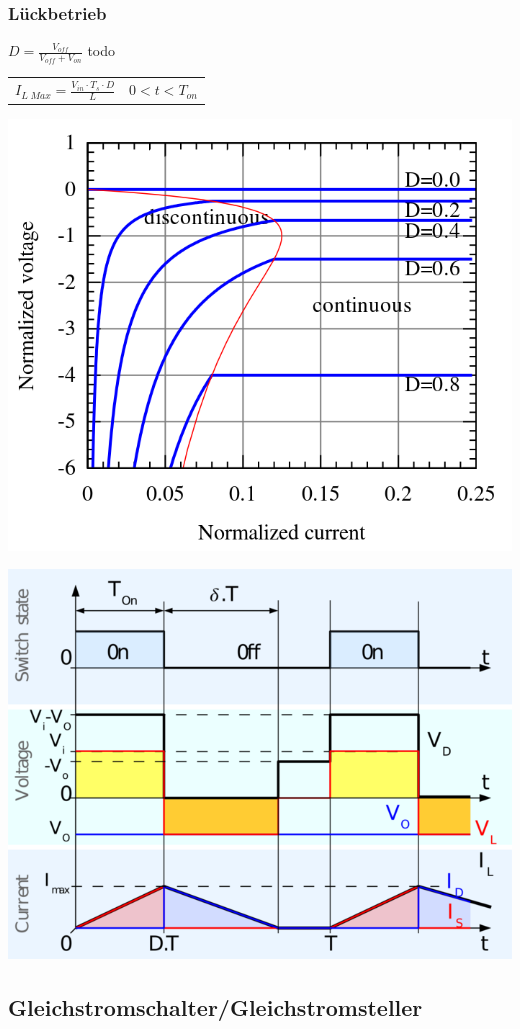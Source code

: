 \subsubsection{Lückbetrieb}
\begin{minipage}{0.75\linewidth}
    $ D= \frac{V_{off}}{V_{off}+V_{on}} $\newline
    todo\newline
    
    \begin{tabular}{p{9cm} p{3cm}}
        $ I_{L\;Max} = \frac{V_{in}\cdot T_s \cdot D}{L} $ &
        $ 0<t<T_{on} $
        \\  

    \end{tabular}
\includegraphics[width=0.2\linewidth]{images/InverseLueckGrenze}
\end{minipage}
\begin{minipage}{0.25\linewidth}
    \includegraphics[width=\linewidth]{images/InverseSwitchLueck}
\end{minipage}
\clearpage

\subsection{Gleichstromschalter/Gleichstromsteller}
